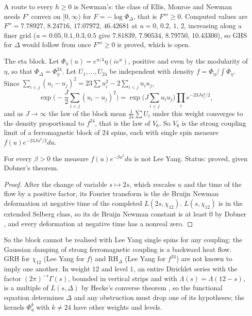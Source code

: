 A route to every $h\ge0$ is Newman's: the class of Ellis, Monroe and Newman \cite{EMN76} needs $F'$ convex on $[0,\infty)$ for $F=-\log\Phi_\Delta$, that is $F'''\ge0$. Computed values are $F''=7.78927$, $8.24716$, $17.07972$, $46.42681$ at $u=0$, $0.2$, $1$, $2$, increasing along a finer grid ($u=0.05,0.1,0.3,0.5$ give $7.81839$, $7.90534$, $8.79750$, $10.43300$), so GHS for $\Delta$ would follow from \cite{EMN76} once $F'''\ge0$ is proved, which is open.

The eta block. Let $\Phi_\eta(u)=e^{u/4}\eta(ie^u)$, positive and even by the modularity of $\eta$, so that $\Phi_\Delta=\Phi_\eta^{24}$. Let $U_1,\dots,U_{24}$ be independent with density $f=\Phi_\eta/\int\Phi_\eta$. Since $\sum_{i<j}(u_i-u_j)^2=23\sum u_i^2-2\sum_{i<j}u_iu_j$,
\[
\exp\Big(-\frac J2\sum_{i<j}(u_i-u_j)^2\Big)=\exp\Big(J\sum_{i<j}u_iu_j\Big)\prod_ie^{-23Ju_i^2/2},
\]
and as $J\to\infty$ the law of the block mean $\frac1{24}\sum U_i$ under this weight converges to the density proportional to $f^{24}$, that is the law of $V_6$. So $V_6$ is the strong coupling limit of a ferromagnetic block of $24$ spins, each with single spin measure $f(u)e^{-23Ju^2/2}du$.

\begin{proposition}\label{dl:prop:eta}
For every $\beta>0$ the measure $f(u)e^{-\beta u^2}du$ is not Lee Yang. Status: proved, given Dobner's theorem.
\end{proposition}

\begin{proof}
After the change of variable $s\mapsto2s$, which rescales $u$ and the time of the flow by a positive factor, its Fourier transform is the de Bruijn Newman deformation at negative time of the completed $L(2s,\chi_{12})$. $L(s,\chi_{12})$ is in the extended Selberg class, so its de Bruijn Newman constant is at least $0$ by Dobner \cite{Dobner21}, and every deformation at negative time has a nonreal zero.
\end{proof}

So the block cannot be realised with Lee Yang single spins for any coupling: the Gaussian damping of strong ferromagnetic coupling is a backward heat flow. GRH for $\chi_{12}$ (Lee Yang for $f$) and $\mathrm{RH}_\Delta$ (Lee Yang for $f^{24}$) are not known to imply one another. In weight $12$ and level $1$, an entire Dirichlet series with the factor $(2\pi)^{-s}\Gamma(s)$, bounded in vertical strips and with $\Lambda(s)=\Lambda(12-s)$, is a multiple of $L(s,\Delta)$ by Hecke's converse theorem \cite{Hecke36}, so the functional equation determines $\Delta$ and any obstruction must drop one of its hypotheses; the kernels $\Phi_\eta^k$ with $k\ne24$ have other weights and levels.

